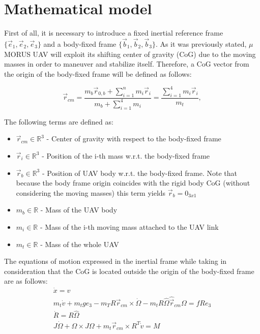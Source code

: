 \section{Mathematical model}

First of all, it is necessary to introduce a fixed inertial reference frame $\{ \vec{e}_1, \vec{e}_2, \vec{e}_3  \}$ and a body-fixed frame $ \{ \vec{b}_1, \vec{b}_2, \vec{b}_3 \}$. As it was previously stated, $\mu$MORUS UAV will exploit its shifting center of gravity (CoG) due to the moving masses in order to maneuver and stabilize itself. Therefore, a CoG vector from the origin of the body-fixed frame will be defined as follows:

\begin{equation}
	\vec{r}_{cm} = \frac{m_{b}\vec{r}_{0,b} + \sum_{i=1}^n m_{i}\vec{r}_{i}}{m_{b} + \sum_{i=1}^4 m_{i}} = \frac{\sum_{i=1}^4 m_{i}\vec{r}_{i}}{m_t},
	\label{equ:cog}
\end{equation}

The following terms are defined as: 
\begin{itemize}
	\item $\vec{r}_{cm} \in \mathbb{R}^3$ - Center of gravity with respect to the body-fixed frame
	
	\item $\vec{r}_{i} \in \mathbb{R}^3$ - Position of the i-th mass w.r.t. the body-fixed frame
	
	\item $\vec{r}_{b} \in \mathbb{R}^3$ - Position of UAV body w.r.t. the body-fixed frame. Note that because the body frame origin coincides with the rigid body CoG (without considering the moving masses) this term yields $\vec{r}_b = 0_{3x1}$
	
	\item $m_b \in \mathbb{R}$ - Mass of the UAV body 
	
	\item $m_i \in \mathbb{R}$ - Mass of the i-th moving mass attached to the UAV link
	
	\item $m_t \in \mathbb{R}$ - Mass of the whole UAV
\end{itemize}

The equations of motion expressed in the inertial frame while taking in consideration that the CoG is located outside the origin of the body-fixed frame are as follows\cite{LeeModel}: 
\begin{gather}
	\dot{x} = v \label{model1}\\
	m_t\dot{v} + m_tge_3 - m_TR \vec{r}_{cm} \times \dot{\Omega} - m_tR\hat{\Omega}\hat{\vec{r}}_{cm}\Omega = fRe_3 \label{model2} \\
	\dot{R} = R\hat{\Omega} \label{model3} \\
	J \dot{\Omega} + \Omega \times J \Omega + m_t \vec{r}_{cm} \times R^T \dot{v} = M \label{model4}
\end{gather}

